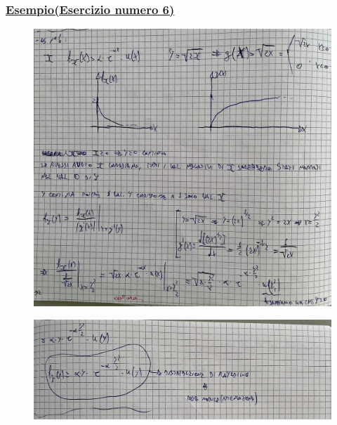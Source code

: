 \documentclass{article}
\begin{document}
\subsubsection{\underline{Esempio(Esercizio numero 6)}}
\begin{figure}[ht]
\centering
\includegraphics[scale=0.10]{ese/25.jpeg}
\end{figure}
\begin{figure}[ht]
\centering
\includegraphics[scale=0.10]{ese/25a.jpeg}
\end{figure}
\end{document}
